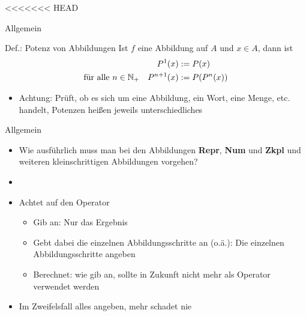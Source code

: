 \newcommand{\lul}[2]{
	\temporal<2>{#1}{\textcolor{red}{#1}}{\textcolor{kit-green100}{#2}}
}

\newcommand{\lulz}[1]{\lul{#1}{#1}}




<<<<<<< HEAD
\begin{frame}{Allgemein}
    \begin{block}{Def.: Potenz von Abbildungen}
    	Ist $f$ eine Abbildung auf $A$ und $x \in A$, dann ist
    	\begin{align*}
    		P^1(x) &:= P(x) \\
    		\text{für alle } n\in \mathbb{N}_+ \quad P^{n+1}(x) &:= P(P^n(x))
    	\end{align*}
    \end{block}

    \begin{itemize}
    	\item \alert{Achtung}: Prüft, ob es sich um eine Abbildung, ein Wort, eine Menge, etc. handelt, Potenzen heißen jeweils unterschiedliches
    \end{itemize}

\end{frame}

\begin{frame}{Allgemein}
\begin{itemize}
	\item Wie ausführlich muss man bei den Abbildungen \textbf{Repr}, \textbf{Num} und \textbf{Zkpl} und weiteren kleinschrittigen Abbildungen vorgehen?
	\item[]
	\item Achtet auf den Operator
	\begin{itemize}
		\item Gib an: Nur das Ergebnis
		\item Gebt dabei die einzelnen Abbildungsschritte an (o.ä.): Die einzelnen Abbildungsschritte angeben
		\item Berechnet: wie gib an, sollte in Zukunft nicht mehr als Operator verwendet werden
	\end{itemize}
	\item Im Zweifelsfall alles angeben, mehr schadet nie
\end{itemize}
\end{frame}




